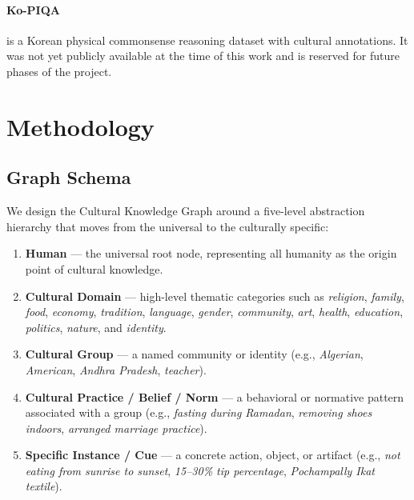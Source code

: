 \documentclass[11pt]{article}
\begin{document}
\paragraph{Ko-PIQA} \cite{choi2025kopiqa} is a Korean physical
commonsense reasoning dataset with cultural annotations.
It was not yet publicly available at the time of this work and is
reserved for future phases of the project.

\section{Methodology}
\label{sec:methodology}

\subsection{Graph Schema}
\label{sec:schema}

We design the Cultural Knowledge Graph around a five-level abstraction
hierarchy that moves from the universal to the culturally specific:

\begin{enumerate}
    \item[\textbf{L0}] \textbf{Human} — the universal root node,
    representing all humanity as the origin point of cultural knowledge.
    \item[\textbf{L1}] \textbf{Cultural Domain} — high-level thematic
    categories such as \emph{religion}, \emph{family}, \emph{food},
    \emph{economy}, \emph{tradition}, \emph{language}, \emph{gender},
    \emph{community}, \emph{art}, \emph{health}, \emph{education},
    \emph{politics}, \emph{nature}, and \emph{identity}.
    \item[\textbf{L2}] \textbf{Cultural Group} — a named community or
    identity (e.g., \emph{Algerian}, \emph{American}, \emph{Andhra
    Pradesh}, \emph{teacher}).
    \item[\textbf{L3}] \textbf{Cultural Practice / Belief / Norm} — a
    behavioral or normative pattern associated with a group
    (e.g., \emph{fasting during Ramadan},
    \emph{removing shoes indoors},
    \emph{arranged marriage practice}).
    \item[\textbf{L4}] \textbf{Specific Instance / Cue} — a concrete
    action, object, or artifact
    (e.g., \emph{not eating from sunrise to sunset},
    \emph{15--30\% tip percentage},
    \emph{Pochampally Ikat textile}).
\end{enumerate}
\end{document}
